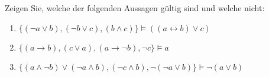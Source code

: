 \begin{exercise}
  \label{logic:truth-table-1}
  Zeigen Sie, welche der folgenden Aussagen gültig sind und welche nicht:
  \begin{enumerate}[label={\alph*)}]
  \item $\{ (\neg a \vee b), (\neg b \vee c), (b \wedge c) \}
    \models ((a \leftrightarrow b) \vee c)$
  \item $\{ (a \rightarrow b), (c \vee a), (a \rightarrow \neg b),
    \neg c \} \models a$
  \item $\{ (a \wedge \neg b) \vee (\neg a \wedge b), (\neg c
    \wedge b), \neg (\neg a \vee b) \} \models \neg(a \vee b)$
  \end{enumerate}
\end{exercise}

